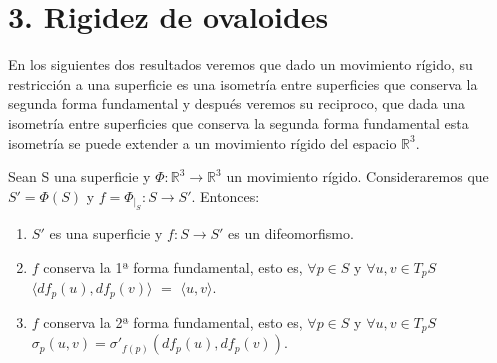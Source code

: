 \chapter*{3. Rigidez de ovaloides}





En los siguientes dos resultados veremos que dado un movimiento rígido, su restricción a una superficie es una isometría entre superficies que conserva la segunda forma fundamental y después veremos su reciproco, que dada una isometría entre superficies que conserva la segunda forma fundamental esta isometría se puede extender a un movimiento rígido del espacio $\mathbb{R}^3$.

\begin{proposicion}\label{prop:rig1} %
	Sean S una superficie y  $\Phi : \mathbb{R}^3 \to \mathbb{R}^3$  un movimiento rígido. Consideraremos que $S' = \Phi(S)$ y $f = \Phi_{\mid_{S}} : S \to S'$. Entonces:
	\begin{enumerate}
		\item $S'$ es una superficie y $f : S \to S'$ es un difeomorfismo.
		\item $f$ conserva la 1ª forma fundamental, esto es, $\forall p \in S$ y $\forall u,v \in T_p S$ $\langle df_p(u), df_p(v) \rangle $ $=$ $ \langle u, v \rangle$.
		\item $f$ conserva la 2ª forma fundamental, esto es, $\forall p \in S$ y $\forall u,v \in T_p S$ $\sigma_p(u,v) = \sigma'_{f(p)}(df_p(u), df_p(v))$.
	\end{enumerate}
\end{proposicion}

